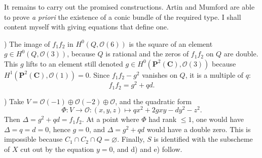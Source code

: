 \documentclass[12pt]{amsart}
\theoremstyle{plain}
\theoremstyle{definition}
\theoremstyle{remark}
\begin{document}
It remains to carry out the promised constructions. Artin and Mumford are able to
prove \emph{a priori} the existence of a conic bundle of the required type. I shall
content myself with giving equations that define one.

\medskip
{}) The image of $f_1f_2$ in $H^0(Q,\mathcal O(6))$ is the square of an
element $g\in H^0(Q,\mathcal O(3))$, because $Q$ is rational and the zeros of
$f_1f_2$ on $Q$ are double. This $g$ lifts to an element still denoted
$g\in H^0(\mathbf P^2(\mathbf C),\mathcal O(3))$ because
$H^1(\mathbf P^2(\mathbf C),\mathcal O(1))=0$. Since $f_1f_2-g^2$ vanishes on $Q$,
it is a multiple of $q$:
\[
f_1f_2=g^2+qd.
\]

) Take
$V=\mathcal O(-1)\oplus \mathcal O(-2)\oplus \mathcal O$, and the quadratic form
\[
\Phi\colon V\to \mathcal O\colon (x,y,z)\longmapsto qx^2+2gxy-dy^2-z^2.
\]
Then $\Delta=g^2+qd=f_1f_2$. At a point where $\Phi$ had rank $\leqslant 1$, one
would have $\Delta=q=d=0$, hence $g=0$, and $\Delta=g^2+qd$ would have a double
zero. This is impossible because $C_1\cap C_2\cap Q=\varnothing$. Finally, $S$ is
identified with the subscheme of $X$ cut out by the equation $y=0$, and d) and e)
follow.
\end{document}
